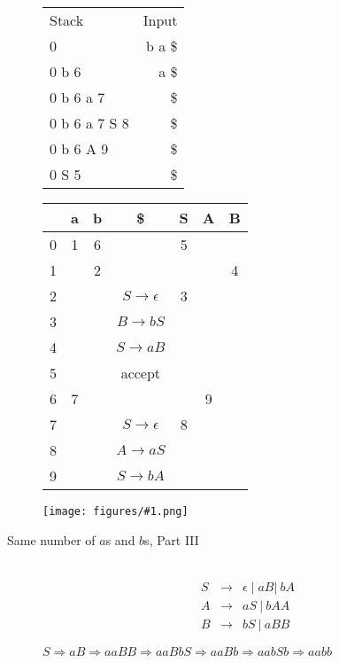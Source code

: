 \documentclass[12pt]{article}
\newcommand{\myfig}[1]{\texttt{[image: figures/\#1.png]}}
\newcommand{\arr}[2]{$#1\rightarrow #2$}
\newcommand{\arrl}[1]{$#1\rightarrow \mt$}
\newcommand{\mt}{\ensuremath{\epsilon}}
\begin{document}
\begin{description}
\begin{tabular}{lr}
Stack & Input \\
0     & b a \$\\
0 b 6 & a \$\\
0 b 6 a 7 & \$\\
0 b 6 a 7 S 8 & \$\\
0 b 6 A 9 & \$\\
0 S 5 & \$\\
\end{tabular}\hfill
\begin{tabular}{|c|c|c|c|c|c|c|}\hline
  & a & b & \$ & S & A & B \\\hline
0 & 1 & 6 &    & 5  &   &   \\\hline
1 &   & 2 &    &   &   &  4 \\\hline
2 &   &   &\arrl{S}& 3 &   &   \\\hline
3 &   &   &\arr{B}{bS} &   &   &   \\\hline
4 &   &   &\arr{S}{aB} &   &   &   \\\hline
5 &   &   &  accept   &   &   &   \\\hline
6 & 7 &   &    &   & 9 &   \\\hline
7 &   &   &\arrl{S}& 8  &   &   \\\hline
8 &   &   &\arr{A}{aS} &   &   &   \\\hline
9 &   &   &\arr{S}{bA} &   &   &   \\\hline
\end{tabular}

\vspace{.5in}

\myfig{lrparseexamples06}



\newpage
\item[Same number of $a$s and $b$s, Part III]\mbox{}\\

\begin{eqnarray*}
S &\rightarrow&  \mt \mid  aB |\ bA\\
A &\rightarrow& aS\ |\ bAA\\
B &\rightarrow& bS\ |\ aBB
\end{eqnarray*}

\centerline{$S \Rightarrow aB\Rightarrow aaBB\Rightarrow aaBbS
\Rightarrow aaBb \Rightarrow aabSb \Rightarrow aabb$}


\end{description}
\end{document}
